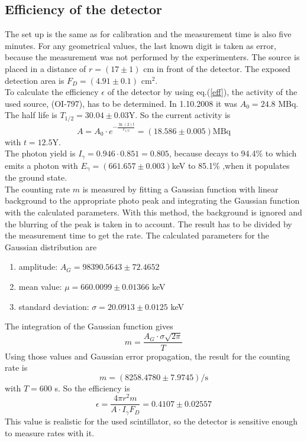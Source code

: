 \documentclass{article}
\begin{document}
\subsection{Efficiency of the detector}

The set up is the same as for calibration and the measurement time is also five minutes.
For any geometrical values, the last known digit is taken as error, because the measurement was not performed by the experimenters.
The source is placed in a distance of $r=(17 \pm 1)$ cm in front of the detector.
The exposed detection area is $F_D = (4.91 \pm 0.1)$ cm$^2$.\\
To calculate the efficiency $\epsilon$ of the detector by using eq.(\ref{eff}), the activity of the used source, (OI-797), has to be determined.
In 1.10.2008 it was $A_0 = 24.8$ MBq.\\
The half life is $T_{1/2}=30.04 \pm 0.03$Y. So the current activity is 
\begin{equation*}
    A = A_0\cdot e^{-\frac{\ln{(2)}t}{T_{1/2}}} = (18.586 \pm 0.005)\mbox{MBq}
\end{equation*}
with $t=12.5$Y.\\
The photon yield is $I_\gamma = 0.946 \cdot  0.851 = 0.805$, because  decays to 94.4\% to  which emits a photon with $E_\gamma = (661.657 \pm 0.003)$keV to 85.1\% ,when it populates the ground state.\\
The counting rate $m$ is measured by fitting a Gaussian function with linear background to the appropriate photo peak and integrating the Gaussian function with the calculated parameters. With this method, the background is ignored and the blurring of the peak is taken in to account. The result has to be divided by the measurement time to get the rate. The calculated parameters for the Gaussian distribution are
\begin{enumerate}
    \item[~]amplitude: $A_G = 98390.5643 \pm 72.4652$
    \item[~]mean value: $\mu = 660.0099 \pm 0.01366$ keV
    \item[~]standard deviation: $\sigma = 20.0913 \pm 0.0125$ keV
\end{enumerate}
The integration of the Gaussian function gives
\begin{equation*}
    m = \frac{A_G\cdot\sigma\sqrt{2\pi}}{T} 
\end{equation*}
Using those values and Gaussian error propagation, the result for the counting rate is
\begin{equation*}
    m = (8258.4780 \pm  7.9745)/\mbox{s}
\end{equation*}
with $T = 600$ s. So the efficiency is
\begin{equation*}
    \epsilon = \frac{4\pi r^2 m}{A\cdot I_\gamma F_D} = 0.4107  \pm  0.02557
\end{equation*}
This value is realistic for the used scintillator, so the detector is sensitive enough to measure rates with it.
\end{document}

